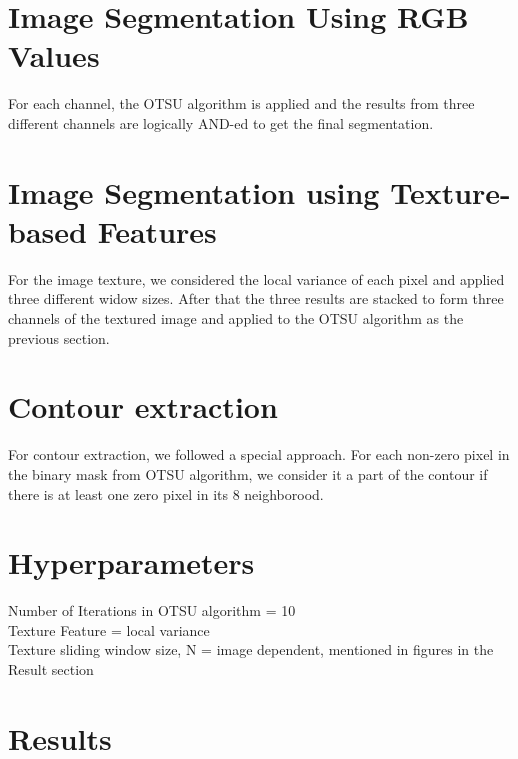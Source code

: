 \documentclass{article}
\begin{document}
\section{Image Segmentation Using RGB Values}
For each channel, the OTSU algorithm is applied and the results from three different channels are logically AND-ed to get the final segmentation.
\section{Image Segmentation using Texture-based Features}
For the image texture, we considered the local variance of each pixel and applied three different widow sizes. After that the three results are stacked to form three channels of the textured image and applied to the OTSU algorithm as the previous section.
\section{Contour extraction}
For contour extraction, we followed a special approach. For each non-zero pixel in the binary mask from OTSU algorithm, we consider it a part of the contour if there is at least one zero pixel in its 8 neighborood.
\section{Hyperparameters}
Number of Iterations in OTSU algorithm = 10\\
Texture Feature = local variance\\
Texture sliding window size, N = image dependent, mentioned in figures in the Result section


\newpage
\section{Results}
\end{document}
